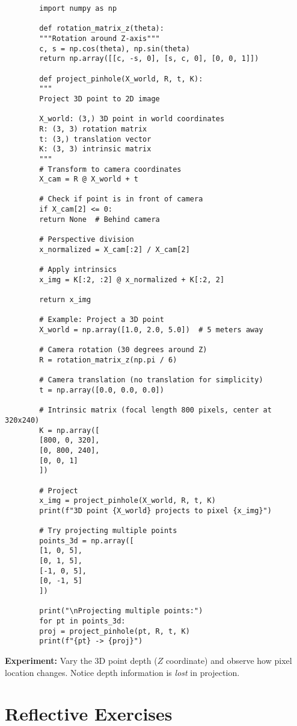 \begin{codebox}
	\begin{lstlisting}
		import numpy as np
		
		def rotation_matrix_z(theta):
		"""Rotation around Z-axis"""
		c, s = np.cos(theta), np.sin(theta)
		return np.array([[c, -s, 0], [s, c, 0], [0, 0, 1]])
		
		def project_pinhole(X_world, R, t, K):
		"""
		Project 3D point to 2D image
		
		X_world: (3,) 3D point in world coordinates
		R: (3, 3) rotation matrix
		t: (3,) translation vector
		K: (3, 3) intrinsic matrix
		"""
		# Transform to camera coordinates
		X_cam = R @ X_world + t
		
		# Check if point is in front of camera
		if X_cam[2] <= 0:
		return None  # Behind camera
		
		# Perspective division
		x_normalized = X_cam[:2] / X_cam[2]
		
		# Apply intrinsics
		x_img = K[:2, :2] @ x_normalized + K[:2, 2]
		
		return x_img
		
		# Example: Project a 3D point
		X_world = np.array([1.0, 2.0, 5.0])  # 5 meters away
		
		# Camera rotation (30 degrees around Z)
		R = rotation_matrix_z(np.pi / 6)
		
		# Camera translation (no translation for simplicity)
		t = np.array([0.0, 0.0, 0.0])
		
		# Intrinsic matrix (focal length 800 pixels, center at 320x240)
		K = np.array([
		[800, 0, 320],
		[0, 800, 240],
		[0, 0, 1]
		])
		
		# Project
		x_img = project_pinhole(X_world, R, t, K)
		print(f"3D point {X_world} projects to pixel {x_img}")
		
		# Try projecting multiple points
		points_3d = np.array([
		[1, 0, 5],
		[0, 1, 5],
		[-1, 0, 5],
		[0, -1, 5]
		])
		
		print("\nProjecting multiple points:")
		for pt in points_3d:
		proj = project_pinhole(pt, R, t, K)
		print(f"{pt} -> {proj}")
	\end{lstlisting}
	
	\textbf{Experiment:} Vary the 3D point depth ($Z$ coordinate) and observe how pixel location changes. Notice depth information is \textit{lost} in projection.
\end{codebox}

\section{Reflective Exercises}

